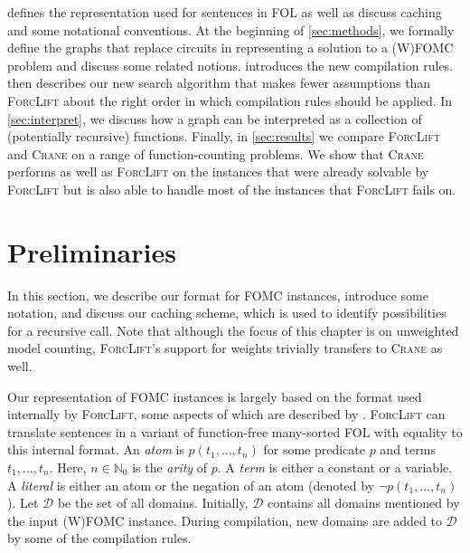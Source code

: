 
 defines the representation used for sentences in FOL as
well as discuss caching and some notational conventions. At the beginning of
\cref{sec:methods}, we formally define the graphs that replace circuits in
representing a solution to a (W)FOMC problem and discuss some related notions.
 introduces the new compilation rules.  then
describes our new search algorithm that makes fewer assumptions than
\textsc{ForcLift} about the right order in which compilation rules should be
applied. In \cref{sec:interpret}, we discuss how a graph can be interpreted as a
collection of (potentially recursive) functions. Finally, in \cref{sec:results}
we compare \textsc{ForcLift} and \textsc{Crane} on a range of function-counting
problems. We show that \textsc{Crane} performs as well as \textsc{ForcLift} on
the instances that were already solvable by \textsc{ForcLift} but is also able
to handle most of the instances that \textsc{ForcLift} fails on.


\section{Preliminaries}\label{sec:recprelims}

In this section, we describe our format for FOMC instances, introduce some
notation, and discuss our caching scheme, which is used to identify
possibilities for a recursive call. Note that although the focus of this chapter
is on unweighted model counting, \textsc{ForcLift}'s
\citep{DBLP:conf/ijcai/BroeckTMDR11} support for weights trivially transfers to
\textsc{Crane} as well.

Our representation of FOMC instances is largely based on the format used
internally by \textsc{ForcLift}, some aspects of which are described by
\citet{DBLP:conf/ijcai/BroeckTMDR11}. \textsc{ForcLift} can translate sentences
in a variant of function-free many-sorted FOL with equality to this internal
format. An \emph{atom} is $p(t_1, \dots, t_n)$ for some predicate $p$ and terms
$t_{1}, \dots, t_{n}$. Here, $n \in \mathbb{N}_0$ is the \emph{arity} of $p$. A
\emph{term} is either a constant or a variable. A \emph{literal} is either an
atom or the negation of an atom (denoted by $\neg p(t_1, \dots, t_n)$). Let
$\mathcal{D}$ be the set of all domains. Initially, $\mathcal{D}$ contains all
domains mentioned by the input (W)FOMC instance. During compilation, new domains
are added to $\mathcal{D}$ by some of the compilation rules.

